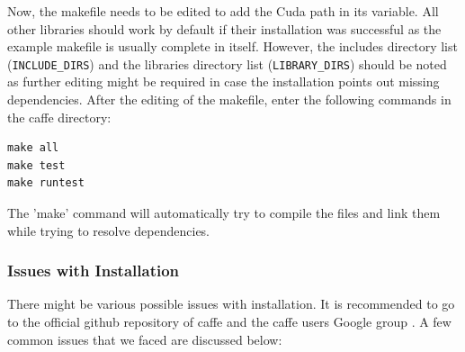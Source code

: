\documentclass{article}
\begin{document}
Now, the makefile needs to be edited to add the Cuda path in its variable. All other libraries should work by default if their installation was successful as the example makefile is usually complete in itself. However, the includes directory list (\verb|INCLUDE_DIRS|) and the libraries directory list (\verb|LIBRARY_DIRS|) should be noted as further editing might be required in case the installation points out missing dependencies. After the editing of the makefile, enter the following commands in the caffe directory:
\begin{verbatim}
make all
make test
make runtest
\end{verbatim}

The 'make' command will automatically try to compile the files and link them while trying to resolve dependencies.
\subsubsection{Issues with Installation}
There might be various possible issues with installation. It is recommended to go to the official github repository of caffe and the caffe users Google group \cite{gg}. A few common issues that we faced are discussed below:
\end{document}
